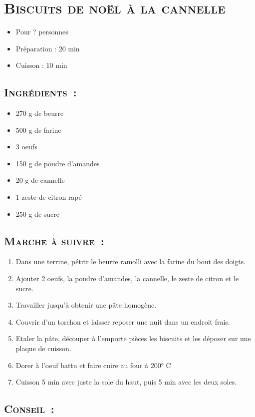 \section[\normalsize{Biscuits de noël \`a la cannelle}]{\LARGE{\textsc{Biscuits de noël \`a la cannelle}}}		%


\begin{itemize}
\item Pour ? personnes
\item Préparation : 20 min
\item Cuisson : 10 min
\end{itemize}

\subsection*{\textsc{Ingr\'edients~:}}

\begin{itemize}

\item 270 g de beurre
\item 500 g de farine
\item 3 oeufs
\item 150 g de poudre d'amandes
\item 20 g de cannelle
\item 1 zeste de citron rap\'e
\item 250 g de sucre 
\end{itemize}


\subsection*{\textsc{Marche \`a suivre~:}}

\begin{enumerate}
\item Dans une terrine, p\'etrir le beurre ramolli avec la farine du bout des doigts. 
\item Ajouter 2 oeufs, la poudre d'amandes, la cannelle, le zeste de citron et le sucre. 
\item Travailler jusqu'\`a obtenir une p\^ate homog\`ene. 
\item Couvrir d'un torchon et laisser reposer une nuit dans un endroit frais.
\item Etaler la p\^ate, d\'ecouper \`a l'emporte pi\`eces les biscuits et les d\'eposer sur une plaque de cuisson. 
\item Dorer \`a l'oeuf battu et faire cuire au four \`a 200° C
\item Cuisson 5 min avec juste la sole du haut, puis 5 min avec les deux soles.

\end{enumerate}
\subsection*{\textsc{Conseil~:}}
